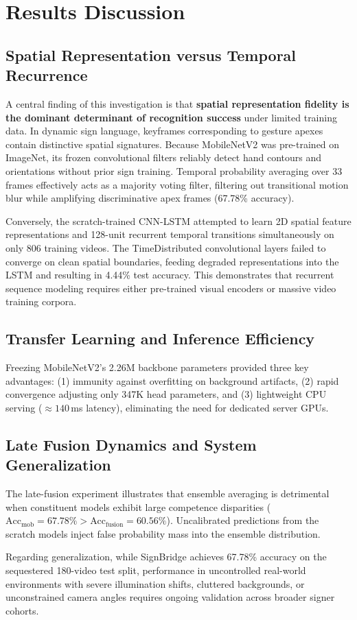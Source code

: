 \chapter{Results Discussion}
\label{ch:discussion}

\section{Spatial Representation versus Temporal Recurrence}
\label{sec:spatial_vs_temporal}
A central finding of this investigation is that \textbf{spatial representation fidelity is the dominant determinant of recognition success} under limited training data. In dynamic sign language, keyframes corresponding to gesture apexes contain distinctive spatial signatures. Because MobileNetV2 was pre-trained on ImageNet, its frozen convolutional filters reliably detect hand contours and orientations without prior sign training. Temporal probability averaging over 33 frames effectively acts as a majority voting filter, filtering out transitional motion blur while amplifying discriminative apex frames (67.78\% accuracy).

Conversely, the scratch-trained CNN-LSTM attempted to learn 2D spatial feature representations and 128-unit recurrent temporal transitions simultaneously on only 806 training videos. The TimeDistributed convolutional layers failed to converge on clean spatial boundaries, feeding degraded representations into the LSTM and resulting in 4.44\% test accuracy. This demonstrates that recurrent sequence modeling requires either pre-trained visual encoders or massive video training corpora.

\section{Transfer Learning and Inference Efficiency}
\label{sec:transfer_learning_efficiency}
Freezing MobileNetV2's 2.26M backbone parameters provided three key advantages: (1) immunity against overfitting on background artifacts, (2) rapid convergence adjusting only 347K head parameters, and (3) lightweight CPU serving ($\approx 140$\,ms latency), eliminating the need for dedicated server GPUs.

\section{Late Fusion Dynamics and System Generalization}
\label{sec:fusion_generalization}
The late-fusion experiment illustrates that ensemble averaging is detrimental when constituent models exhibit large competence disparities ($\text{Acc}_{\text{mob}} = 67.78\% > \text{Acc}_{\text{fusion}} = 60.56\%$). Uncalibrated predictions from the scratch models inject false probability mass into the ensemble distribution.

Regarding generalization, while SignBridge achieves 67.78\% accuracy on the sequestered 180-video test split, performance in uncontrolled real-world environments with severe illumination shifts, cluttered backgrounds, or unconstrained camera angles requires ongoing validation across broader signer cohorts.
